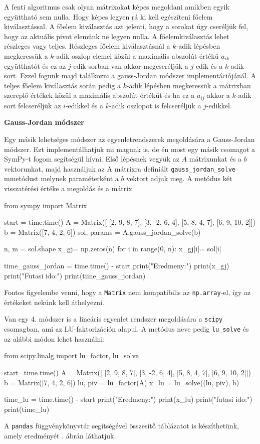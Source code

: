     A fenti algoritmus csak olyan mátrixokat képes megoldani amikben egyik
együttható sem nulla. Hogy képes legyen rá ki kell egészíteni főelem
kiválasztással. A főelem kiválasztás azt jelenti, hogy a sorokat úgy
cseréljük fel, hogy az aktuális pivot elemünk ne legyen nulla. A
főelemkiválasztás lehet részleges vagy teljes. Részleges főelem
kiválasztásnál a \(k\)-adik lépésben megkeressük a \(k\)-adik oszlop
elemei közül a maximális abszolút értékű \(a_{ik}\) együtthatót és ez az
\(j\)-edik sorban van akkor megcseréljük a \(j\)-edik és a \(k\)-adik
sort. Ezzel fogunk majd találkozni a gauss-Jordan módszer
implementációjánál. A teljes főelem kiválasztás során pedig a \(k\)-adik
lépésben megkeressük a mátrixban szereplő értékek közül a maximális
abszolút értékűt és ha ez a \(a_{ij}\) akkor a \(k\)-adik sort
felcseréljük az \(i\)-edikkel és a \(k\)-adik oszlopot is felcseréljük a
\(j\)-edikkel.

\bigskip

\noindent\textbf{Gauss-Jordan módszer}

\medskip

    Egy másik lehetséges módszer az egyenletrendszerek megoldására a
Gauss-Jordan módszer. Ezt implementálhatjuk mi magunk is, de én most egy
másik csomagot a SymPy-t fogom segítségül hívni. Első lépésnek vegyük az
\(A\) mátrixunkat és a \(b\) vektorunkat, majd használjuk az A mátrixra
definiált \texttt{gauss\_jordan\_solve} mmetódust melynek paraméterként
a \(b\) vektort adjuk meg. A metódus két visszatérési értéke a megoldás
és a mátrix.
\begin{python}
from sympy import Matrix

start = time.time()
A = Matrix([
    [2,  9,  8, 7],
    [3, -2,  6, 4],
    [5,  8,  4, 7],
    [6,  9, 10, 2]])
b = Matrix([7, 4, 2, 6])
sol, params = A.gauss_jordan_solve(b)

n, m = sol.shape
x_gj= np.zeros(n)
for i in range(0, n):
    x_gj[i]= sol[i]

time_gauss_jordan = time.time() - start
print("Eredmeny:")
print(x_gj)
print("Futasi ido:")
print(time_gauss_jordan)
\end{python}
    Fontos figyelembe venni, hogy a \texttt{Matrix} nem kompatibilis az \texttt{np.array}-el, így az értékeket
nekünk kell áthelyezni.

    Van egy 4. módszer is a lineáris egyenlet rendszer megoldására a
\texttt{scipy} csomagban, ami az LU-faktorizáción alapul. A metódus neve
pedig \texttt{lu\_solve} és az alábbi módon lehet használni:
\begin{python}
from scipy.linalg import lu_factor, lu_solve

start=time.time()
A = Matrix([
    [2,  9,  8, 7],
    [3, -2,  6, 4],
    [5,  8,  4, 7],
    [6,  9, 10, 2]])
b = Matrix([7, 4, 2, 6])
lu, piv = lu_factor(A)
x_lu = lu_solve((lu, piv), b)

time_lu = time.time() - start
print("Eredmeny:")
print(x_lu)
print("futasi ido:")
print(time_lu)
\end{python}
A \texttt{pandas} függvénykönyvtár segítségével összesítő táblázatot is készíthetünk, amely eredményét . ábrán láthatjuk.

